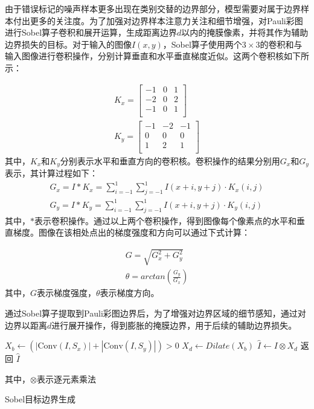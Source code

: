 由于错误标记的噪声样本更多出现在类别交替的边界部分，模型需要对属于边界样本付出更多的关注度。为了加强对边界样本注意力关注和细节增强，对Pauli彩图进行Sobel算子卷积和展开运算，生成距离边界$d$以内的掩膜像素，并将其作为辅助边界损失的目标。对于输入的图像$I(x,y)$，Sobel算子使用两个$3 \times 3$的卷积和与输入图像进行卷积操作，分别计算垂直和水平垂直梯度近似。这两个卷积核如下所示：

\begin{gather}
    K_x=\left[ \begin{matrix}
            -1 & 0 & 1 \\
            -2 & 0 & 2 \\
            -1 & 0 & 1 \\
        \end{matrix} \right]
    \\
    K_y=\left[ \begin{matrix}
            -1 & -2 & -1 \\
            0  & 0  & 0  \\
            1  & 2  & 1  \\
        \end{matrix} \right]
\end{gather}
其中，$K_x$和$K_y$分别表示水平和垂直方向的卷积核。卷积操作的结果分别用$G_x$和$G_y$表示，其计算过程如下：
\begin{gather}
    G_x=I \ast K_x=\sum_{i=-1}^1{\sum_{j=-1}^1{I\left( x+i,y+j \right) \cdot K_x\left( i,j \right)}}
    \\
    G_y=I \ast K_y=\sum_{i=-1}^1{\sum_{j=-1}^1{I\left( x+i,y+j \right) \cdot K_y\left( i,j \right)}}
\end{gather}
其中，$\ast$表示卷积操作。通过以上两个卷积操作，得到图像每个像素点的水平和垂直梯度。图像在该相处点出的梯度强度和方向可以通过下式计算：

\begin{gather}
    G=\sqrt{G_x^2+G_y^2}
    \\
    \theta=arctan(\frac{G_y}{G_x})
\end{gather}
其中，$G$表示梯度强度，$\theta$表示梯度方向。

通过Sobel算子提取到Pauli彩图边界后，为了增强对边界区域的细节感知，通过对边界以距离$d$进行展开操作，得到膨胀的掩膜边界，用于后续的辅助边界损失。

\begin{algorithm}[H]
    $ X_b\gets \left( \left| \text{Conv}\left( I,S_x \right) \right|+\left| \text{Conv}\left( I,S_y \right) \right| \right) >0 $ \;
    $X_d\gets Dilate(X_b)$ \;
    $\hat{I}\gets I\otimes X_d$ \;
    返回 $\hat{I}$ \;

    其中，$\otimes$表示逐元素乘法
    \caption{Sobel目标边界生成}
    \label{Sobel}
\end{algorithm}


